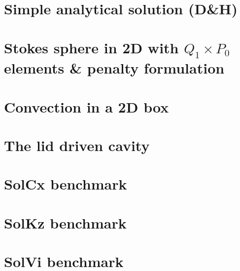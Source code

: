 \documentclass[a4paper,11pt]{report}
\begin{document}
\chapter{Simple analytical solution (D\&H) \label{f01}} %

\chapter{Stokes sphere in 2D with $Q_1\times P_0$ elements \& penalty formulation \label{f02}}

\chapter{Convection in a 2D box \label{f03}} %

\chapter{The lid driven cavity \label{f04}} %

\chapter{SolCx benchmark \label{f05}} %

\chapter{SolKz benchmark \label{f06}} %

\chapter{SolVi benchmark \label{f07}} %
\end{document}
